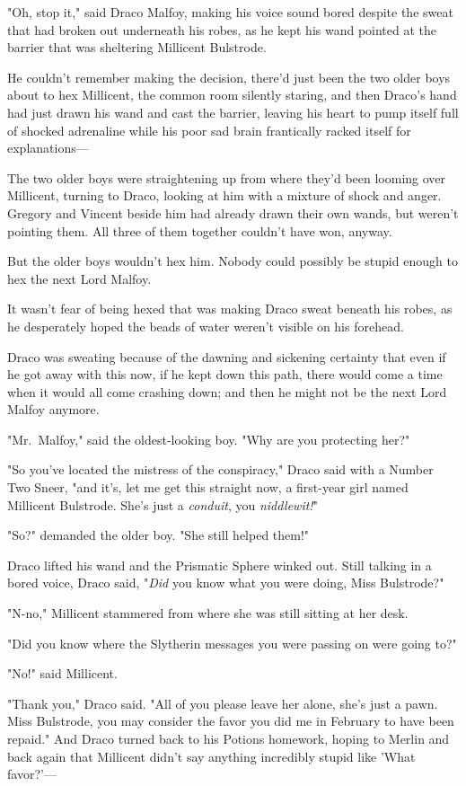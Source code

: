 "Oh, stop it," said Draco Malfoy, making his voice sound bored despite the 
sweat that had broken out underneath his robes, as he kept his wand pointed at 
the barrier that was sheltering Millicent Bulstrode.

He couldn't remember making the decision, there'd just been the two older boys 
about to hex Millicent, the common room silently staring, and then Draco's hand 
had just drawn his wand and cast the barrier, leaving his heart to pump itself 
full of shocked adrenaline while his poor sad brain frantically racked itself 
for explanations---

The two older boys were straightening up from where they'd been looming over 
Millicent, turning to Draco, looking at him with a mixture of shock and anger. 
Gregory and Vincent beside him had already drawn their own wands, but weren't 
pointing them. All three of them together couldn't have won, anyway.

But the older boys wouldn't hex him. Nobody could possibly be stupid enough to 
hex the next Lord Malfoy.

It wasn't fear of being hexed that was making Draco sweat beneath his robes, as 
he desperately hoped the beads of water weren't visible on his forehead.

Draco was sweating because of the dawning and sickening certainty that even if 
he got away with this now, if he kept down this path, there would come a time 
when it would all come crashing down; and then he might not be the next Lord 
Malfoy anymore.

"Mr.~Malfoy," said the oldest-looking boy. "Why are you protecting her?"

"So you've located the mistress of the conspiracy," Draco said with a Number 
Two Sneer, "and it's, let me get this straight now, a first-year girl named 
Millicent Bulstrode. She's just a \emph{conduit}, you \emph{niddlewit!}"

"So?" demanded the older boy. "She still helped them!"

Draco lifted his wand and the Prismatic Sphere winked out. Still talking in a 
bored voice, Draco said, "\emph{Did} you know what you were doing, Miss 
Bulstrode?"

"N-no," Millicent stammered from where she was still sitting at her desk.

"Did you know where the Slytherin messages you were passing on were going to?"

"No!" said Millicent.

"Thank you," Draco said. "All of you please leave her alone, she's just a pawn. 
Miss Bulstrode, you may consider the favor you did me in February to have been 
repaid." And Draco turned back to his Potions homework, hoping to Merlin and 
back again that Millicent didn't say anything incredibly stupid like 'What 
favor?'---

